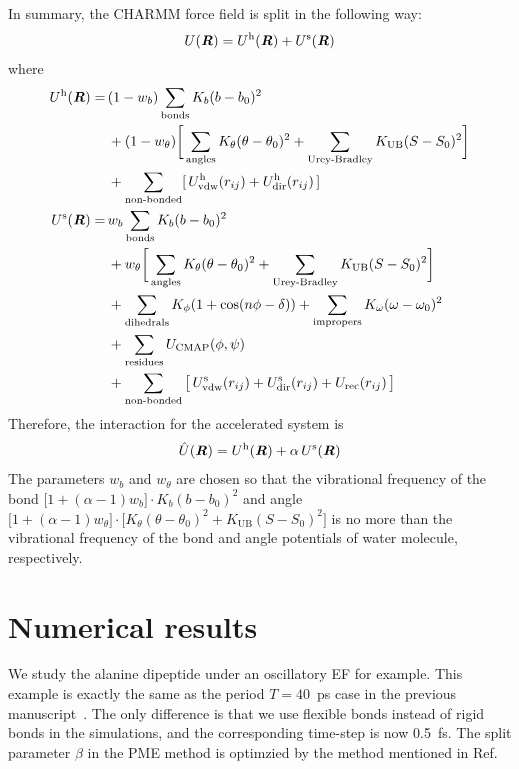 \documentclass[aip,jcp,a4paper,reprint,onecolumn]{revtex4-1}
\newcommand{\vect}[1]{\textbf{\textit{#1}}}
\newcommand{\hard}{\textrm{h}}
\newcommand{\soft}{\textrm{s}}
\newcommand{\vdw}{\textrm{vdw}}
\newcommand{\dir}{\textrm{dir}}
\newcommand{\rec}{\textrm{rec}}
\begin{document}
\noindent
In summary, the CHARMM force field is split in the following way:
\begin{align}
  U(\vect R) = U^\hard(\vect R) + U^\soft(\vect R)
\end{align}
where
\begin{align}\nonumber
  U^\hard(\vect R) =\,&
  (1 - w_b) \sum_{\textrm{bonds}} K_b(b-b_0)^2 \\\nonumber
  &
  +(1 - w_\theta)\bigg[\sum_{\textrm{angles}} K_\theta (\theta - \theta_0)^2
  +\sum_{\textrm{Urey-Bradley}} K_{\textrm{UB}} (S - S_0)^2\bigg]\\\nonumber
  &
  +\sum_{\textrm{non-bonded}} [\,U_{\vdw}^\hard (r_{ij}) + U_{\dir}^\hard (r_{ij})\,] \\\nonumber
  U^\soft(\vect R) =\,&
  w_b\sum_{\textrm{bonds}} K_b(b-b_0)^2 \\\nonumber
  &
  +w_\theta \bigg[\sum_{\textrm{angles}} K_\theta (\theta - \theta_0)^2
  +\sum_{\textrm{Urey-Bradley}} K_{\textrm{UB}} (S - S_0)^2\bigg]\\\nonumber
  &
  +\sum_{\textrm{dihedrals}} K_\phi( 1+\cos(n\phi - \delta)) 
  +\sum_{\textrm{impropers}} K_\omega (\omega - \omega_0)^2\\ \nonumber
  &
  +\sum_{\textrm{residues}} U_{\textrm{CMAP}}(\phi, \psi) \\
  &
  +\sum_{\textrm{non-bonded}}
  \big[\,U^\soft_{\vdw}(r_{ij})
  + U^\soft_{\dir}(r_{ij})
  + U_{\rec}(r_{ij})\,\big]  
\end{align}
Therefore, the interaction for the accelerated system is
\begin{align}
  \hat U(\vect R) = U^\hard(\vect R) + \alpha\,U^\soft(\vect R)  
\end{align}
The parameters $w_b$ and $w_\theta$ are chosen so that the vibrational
frequency of the bond $ \big[1 + (\alpha - 1) w_b\big]\cdot
K_b(b-b_0)^2 $ and angle $ \big[1 + (\alpha - 1) w_\theta\big]\cdot
\big[K_\theta (\theta - \theta_0)^2 +K_{\textrm{UB}} (S - S_0)^2] $ is
no more than the vibrational frequency of the bond and angle
potentials of water molecule, respectively.


\section{Numerical results}
\noindent
We study the alanine dipeptide under an oscillatory EF for example.
This example is exactly the same as the period $T=40$~ps case in the previous
manuscript~\cite{wang2013exploring}. The only difference is that we use
flexible bonds instead of rigid bonds in the simulations, and the corresponding
time-step is now 0.5~fs. The split parameter $\beta$ in the PME method is optimzied by
the method mentioned in Ref.~\cite{wang2010optimizing}\\
\end{document}
